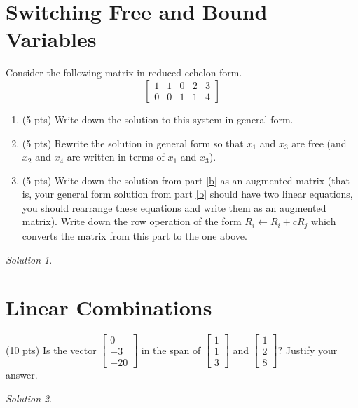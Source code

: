 \documentclass{article}
\theoremstyle{remark}
\newtheorem*{solution}{Solution}
\begin{document}
\pagebreak
\section{Switching Free and Bound Variables}
Consider the following matrix in reduced echelon form.
\begin{displaymath}
  \begin{bmatrix}
    1 & 1 & 0 & 2 & 3 \\
    0 & 0 & 1 & 1 & 4
  \end{bmatrix}
\end{displaymath}
\begin{enumerate}
\item (5 pts) Write down the solution to this system in general form.
\item\label{b} (5 pts) Rewrite the solution in general form so that $x_1$ and $x_3$ are free (and $x_2$ and $x_4$ are written in terms of $x_1$ and $x_3$).
\item\label{c} (5 pts) Write down the solution from part \ref{b} as an augmented matrix (that is, your general form solution from part \ref{b} should have two linear equations, you should rearrange these equations and write them as an augmented matrix).
  Write down the row operation of the form $R_i \gets R_i + cR_j$ which converts the matrix from this part to the one above.
\end{enumerate}

\begin{solution}
\end{solution}

\pagebreak
\section{Linear Combinations}
(10 pts) Is the vector
$
\begin{bmatrix}
  0 \\ -3 \\ -20
\end{bmatrix}
$
in the span of
$
\begin{bmatrix}
  1 \\ 1 \\ 3
\end{bmatrix}
$
and
$
\begin{bmatrix}
  1 \\ 2 \\ 8
\end{bmatrix}?
$
Justify your answer.

\begin{solution}
\end{solution}
\end{document}

